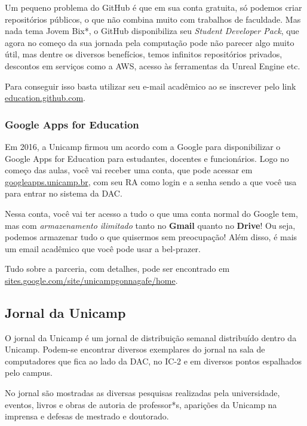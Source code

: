 Um pequeno problema do GitHub é que em sua conta gratuita, só podemos criar
repositórios públicos, o que não combina muito com trabalhos de faculdade. Mas
nada tema Jovem Bix*, o GitHub disponibiliza seu \emph{Student Developer Pack},
que agora no começo da sua jornada pela computação pode não parecer algo muito
útil, mas dentre os diversos benefícios, temos infinitos repositórios privados,
descontos em serviços como a AWS, acesso às ferramentas da Unreal Engine etc.

Para conseguir isso basta utilizar seu e-mail acadêmico ao se inscrever pelo
link \url{education.github.com}.

\subsubsection{Google Apps for Education}

Em 2016, a Unicamp firmou um acordo com a Google para disponibilizar o
Google Apps for Education para estudantes, docentes e funcionários. Logo no
começo das aulas, você vai receber uma conta, que pode acessar em
\url{googleapps.unicamp.br}, com seu RA como login e a senha sendo a que você
usa para entrar no sistema da DAC.

Nessa conta, você vai ter acesso a tudo o que uma conta normal do Google tem,
mas com \emph{armazenamento ilimitado} tanto no \textbf{Gmail} quanto no
\textbf{Drive}! Ou seja, podemos armazenar tudo o que quisermos sem preocupação!
Além disso, é mais um email acadêmico que você pode usar a bel-prazer.

Tudo sobre a parceria, com detalhes, pode ser encontrado em 
\url{sites.google.com/site/unicampgonnagafe/home}.

\subsection{Jornal da Unicamp}

O jornal da Unicamp é um jornal de distribuição semanal distribuído dentro da
Unicamp. Podem-se encontrar diversos exemplares do jornal na sala de
computadores que fica ao lado da DAC, no IC-2 e em diversos pontos espalhados
pelo campus.

No jornal são mostradas as diversas pesquisas realizadas pela universidade,
eventos, livros e obras de autoria de professor*s, aparições da Unicamp na
imprensa e defesas de mestrado e doutorado.
